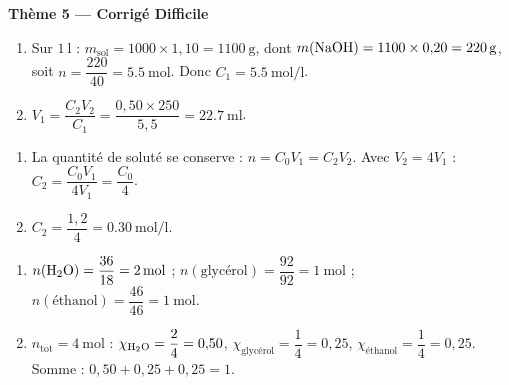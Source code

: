 \documentclass[11pt,a4paper]{article}
\begin{document}
\begin{center}{\large\bfseries\color{primarydark} Thème 5 — Corrigé Difficile}\end{center}

\begin{corrige}
\begin{enumerate}[label=\alph*)]
  \item Sur $\SI{1}{\litre}$ : $m_{\text{sol}} = 1000\times 1{,}10 = \SI{1100}{\gram}$, dont
        $m(\ce{NaOH}) = 1100\times 0{,}20 = \SI{220}{\gram}$, soit $n = \dfrac{220}{40} = \SI{5.5}{\mole}$.
        Donc $C_1 = \SI{5.5}{\mole\per\litre}$.
  \item $V_1 = \dfrac{C_2 V_2}{C_1} = \dfrac{0{,}50\times 250}{5{,}5} = \SI{22.7}{\milli\litre}$.
\end{enumerate}
\end{corrige}

\begin{corrige}
\begin{enumerate}[label=\alph*)]
  \item La quantité de soluté se conserve : $n = C_0 V_1 = C_2 V_2$. Avec $V_2 = 4V_1$ :
        $C_2 = \dfrac{C_0 V_1}{4 V_1} = \dfrac{C_0}{4}$.
  \item $C_2 = \dfrac{1{,}2}{4} = \SI{0.30}{\mole\per\litre}$.
\end{enumerate}
\end{corrige}

\begin{corrige}
\begin{enumerate}[label=\alph*)]
  \item $n(\ce{H2O}) = \dfrac{36}{18} = \SI{2}{\mole}$ ; $n(\text{glycérol}) = \dfrac{92}{92} = \SI{1}{\mole}$ ;
        $n(\text{éthanol}) = \dfrac{46}{46} = \SI{1}{\mole}$.
  \item $n_{\text{tot}} = \SI{4}{\mole}$ : $\chi_{\ce{H2O}} = \dfrac{2}{4} = 0{,}50$,
        $\chi_{\text{glycérol}} = \dfrac{1}{4} = 0{,}25$, $\chi_{\text{éthanol}} = \dfrac{1}{4} = 0{,}25$.
        Somme : $0{,}50 + 0{,}25 + 0{,}25 = 1$.
\end{enumerate}
\end{corrige}
\end{document}
